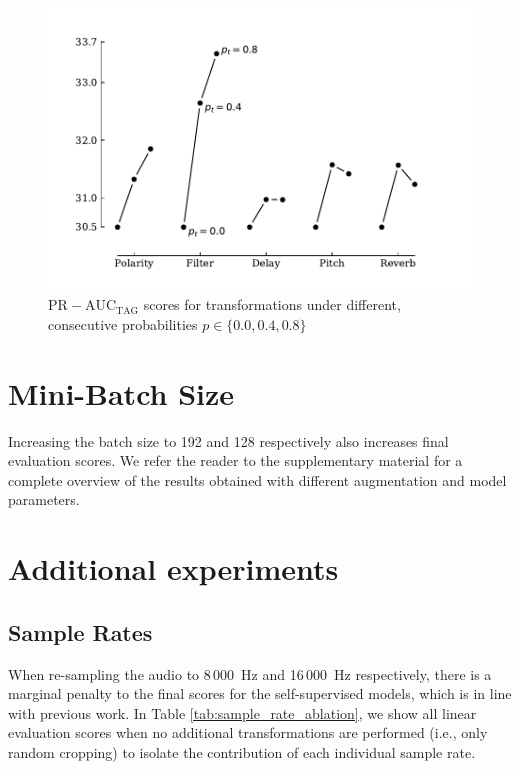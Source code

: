 \begin{figure}[h]
    \centering
    \includegraphics[width=\columnwidth]{figs/transformation_probabilities.pdf}
    \caption[-5cm]{$\mathrm{PR-AUC}_{\mathrm{TAG}}$ scores for transformations under different, consecutive probabilities $p \in \{ 0.0, 0.4, 0.8 \}$}
    \label{fig:transformation_probabilities}
\end{figure}


\section{Mini-Batch Size}
Increasing the batch size to 192 and 128 respectively also increases final evaluation scores.
We refer the reader to the supplementary material for a complete overview of the results obtained with different augmentation and model parameters.



\section{Additional experiments}
\subsection{Sample Rates}    
When re-sampling the audio to 8\,000~Hz and 16\,000~Hz respectively, there is a marginal penalty to the final scores for the self-supervised models, which is in line with previous work\cite{lee2018samplecnn}. In Table \ref{tab:sample_rate_ablation}, we show all linear evaluation scores when no additional transformations are performed (i.e., only random cropping) to isolate the contribution of each individual sample rate.



